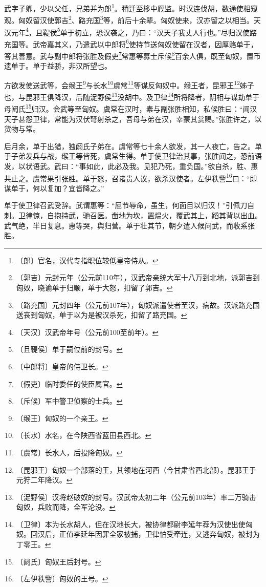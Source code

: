 \documentclass[12pt,UTF-8,openany]{ctexbook}
\begin{document}
\begin{normalsize}
    
    武字子卿，少以父任，兄弟并为郎\footnote{〔郎〕官名，汉代专指职位较低皇帝侍从。}。稍迁至栘中厩监。时汉连伐胡，数通使相窥观。匈奴留汉使郭吉\footnote{〔郭吉〕元封元年（公元前110年），汉武帝亲统大军十八万到北地，派郭吉到匈奴，晓谕单于归顺，单于大怒，扣留了郭吉。}、路充国\footnote{〔路充国〕元封四年（公元前107年），匈奴派遣使者至汉，病故。汉派路充国送丧到匈奴，单于以为是被汉杀死，扣留了路充国。}等，前后十余辈。匈奴使来，汉亦留之以相当。天汉元年\footnote{〔天汉〕汉武帝年号（公元前100至前年）。}，且鞮侯\footnote{〔且鞮侯〕单于嗣位前的封号。}单于初立，恐汉袭之，乃曰：“汉天子我丈人行也。”尽归汉使路充国等。武帝嘉其义，乃遣武以中郎将\footnote{〔中郎将〕皇帝的侍卫长。}使持节送匈奴使留在汉者，因厚赂单于，答其善意。武与副中郎将张胜及假吏\footnote{〔假吏〕临时委任的使臣属官。}常惠等募士斥候\footnote{〔斥候〕军中警卫侦察的士兵。}百余人俱，既至匈奴，置币遗单于。单于益骄，非汉所望也。
    
    方欲发使送武等，会缑王\footnote{〔缑王〕匈奴的一个亲王。}与长水\footnote{〔长水〕水名，在今陕西省蓝田县西北。}虞常\footnote{〔虞常〕长水人，后投降匈奴。}等谋反匈奴中。缑王者，昆邪王\footnote{〔昆邪王〕匈奴一个部落的王，其领地在河西（今甘肃省西北部）。昆邪王于元狩二年降汉。}姊子也，与昆邪王俱降汉，后随浞野侯\footnote{〔浞野侯〕汉将赵破奴的封号。汉武帝太初二年（公元前103年）率二万骑击匈奴，兵败而降，全军沦没。}没胡中。及卫律\footnote{〔卫律〕本为长水胡人，但在汉地长大，被协律都尉李延年荐为汉使出使匈奴。回汉后，正值李延年因罪全家被捕，卫律怕受牵连，又逃奔匈奴，被封为丁零王。}所将降者，阴相与谋劫单于母阏氏\footnote{〔阏氏〕匈奴王后封号。}归汉。会武等至匈奴。虞常在汉时，素与副张胜相知，私候胜曰：“闻汉天子甚怨卫律，常能为汉伏弩射杀之，吾母与弟在汉，幸蒙其赏赐。”张胜许之，以货物与常。
    
    后月余，单于出猎，独阏氏子弟在。虞常等七十余人欲发，其一人夜亡，告之。单于子弟发兵与战，缑王等皆死，虞常生得。单于使卫律治其事，张胜闻之，恐前语发，以状语武。武曰：“事如此，此必及我。见犯乃死，重负国。”欲自杀，胜、惠共止之。虞常果引张胜。单于怒，召诸贵人议，欲杀汉使者。左伊秩訾\footnote{〔左伊秩訾〕匈奴的王号。}曰：“即谋单于，何以复加？宜皆降之。”
    
    单于使卫律召武受辞。武谓惠等：“屈节辱命，虽生，何面目以归汉！”引佩刀自刺。卫律惊，自抱持武，驰召医。凿地为坎，置煴火，覆武其上，蹈其背以出血。武气绝，半日复息。惠等哭，舆归营。单于壮其节，朝夕遣人候问武，而收系张胜。
    

\end{normalsize}
\end{document}

